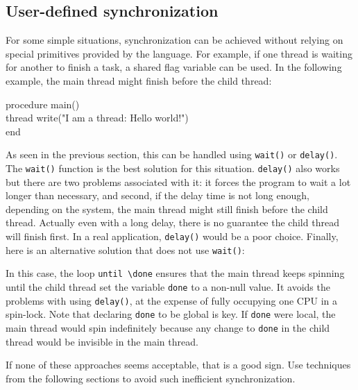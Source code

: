 \subsection*{User-defined synchronization}

For some simple situations, synchronization can be achieved without relying on
special primitives provided by the language.  For example, if one thread is
waiting for another to finish a task, a shared flag variable can be used. In the
following example, the main thread might finish before the child thread:
\begin{icode}
procedure main() \\
\>   thread write("I am a thread: Hello world!") \\
end
\end{icode}
As seen in the previous section, this can be handled using \texttt{wait()} or
\texttt{delay()}. The \texttt{wait()} function is the best solution for this
situation. \texttt{delay()} also works but there are two problems associated
with it: it forces the program to wait a lot longer than necessary, and second,
if the delay time is not long enough, depending on the system, the main thread
might still finish before the child thread.  Actually even with a long delay,
there is no guarantee the child thread will finish first. In a real application,
\texttt{delay()} would be a poor choice.  Finally, here is an alternative
solution that does not use \texttt{wait()}:


In this case, the loop \texttt{until \textbackslash done} ensures that the main
thread keeps spinning until the child thread set the variable \texttt{done} to a
non-null value.  It avoids the problems with using \texttt{delay()}, at the
expense of fully occupying one CPU in a spin-lock.  Note that declaring
\texttt{done} to be global is key. If \texttt{done} were local, the main thread
would spin indefinitely because any change to \texttt{done} in the child thread
would be invisible in the main thread.

If none of these approaches seems acceptable, that is a good sign. Use
techniques from the following sections to avoid such inefficient
synchronization.


